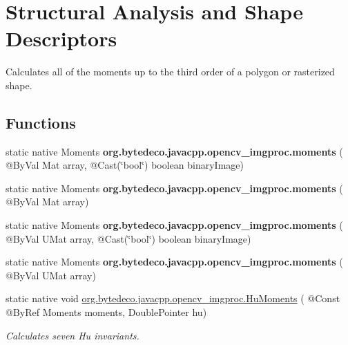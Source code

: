 \hypertarget{group__imgproc__shape}{}\section{Structural Analysis and Shape Descriptors}
\label{group__imgproc__shape}


Calculates all of the moments up to the third order of a polygon or rasterized shape.  


\subsection*{Functions}
\begin{DoxyCompactItemize}
\item 
\mbox{\label{group__imgproc__shape_ga587e64de803dabd38ca391a03a5f4fd9}} 
static native Moments {\bfseries org.\+bytedeco.\+javacpp.\+opencv\+\_\+imgproc.\+moments} ( @By\+Val Mat array, @Cast(\char`\"{}bool\char`\"{}) boolean binary\+Image)
\item 
\mbox{\label{group__imgproc__shape_gaf7a71880cce7ac26c76cfa0b714d8d0b}} 
static native Moments {\bfseries org.\+bytedeco.\+javacpp.\+opencv\+\_\+imgproc.\+moments} ( @By\+Val Mat array)
\item 
\mbox{\label{group__imgproc__shape_ga91d21ed02d573681edb3ea58cf061a54}} 
static native Moments {\bfseries org.\+bytedeco.\+javacpp.\+opencv\+\_\+imgproc.\+moments} ( @By\+Val U\+Mat array, @Cast(\char`\"{}bool\char`\"{}) boolean binary\+Image)
\item 
\mbox{\label{group__imgproc__shape_ga9c86bca4a90148aedbe9e0f389918234}} 
static native Moments {\bfseries org.\+bytedeco.\+javacpp.\+opencv\+\_\+imgproc.\+moments} ( @By\+Val U\+Mat array)
\item 
static native void \hyperlink{group__imgproc__shape_ga352b5f00f51966f12301dfd255d06189}{org.\+bytedeco.\+javacpp.\+opencv\+\_\+imgproc.\+Hu\+Moments} ( @Const @By\+Ref Moments moments, Double\+Pointer hu)
\begin{DoxyCompactList}\small\item\em Calculates seven Hu invariants. \end{DoxyCompactList}\item 

\end{DoxyCompactItemize}

